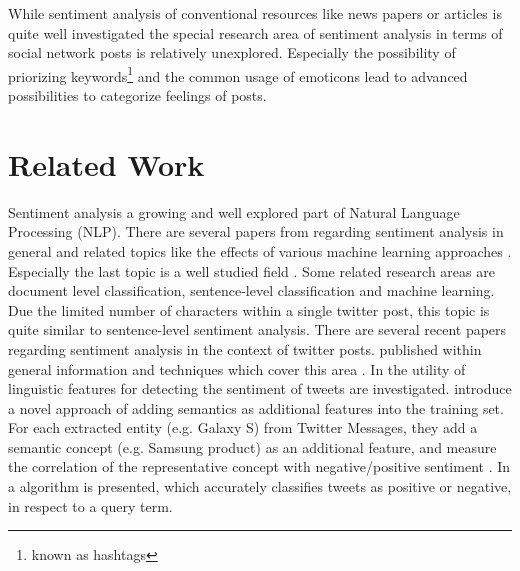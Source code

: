 While sentiment analysis of conventional resources like news papers or articles is quite well investigated the special research area of sentiment analysis in terms of social network posts is relatively unexplored. Especially the possibility of priorizing keywords\footnote{known as hashtags} and the common usage of emoticons lead to advanced possibilities to categorize feelings of posts.


\section{Related Work}
Sentiment analysis a growing and well explored part of Natural Language Processing (NLP). There are several papers from \citeauthor{Pang2008} regarding sentiment analysis in general and related topics like the effects of various machine learning approaches \autocite{Pang2002}\autocite{Pang2008}. Especially the last topic is a well studied field \autocite{Manning2000}.
Some related research areas are document level classification, sentence-level classification and machine learning. Due the limited number of characters within a single twitter post, this topic is quite similar to sentence-level sentiment analysis.
There are several recent papers regarding sentiment analysis in the context of twitter posts. \citeauthor{Agarwal2011} published within  general information and techniques which cover this area \autocite{Agarwal2011}. In  the utility of linguistic features for detecting the sentiment of tweets are investigated. 
\citeauthor{Saif2012} introduce a novel approach of adding semantics as additional features into the training set. For each extracted entity (e.g. Galaxy S) from Twitter Messages, they add a semantic concept (e.g. Samsung product) as an additional feature, and measure the correlation of the representative concept with negative/positive sentiment \autocite{Saif2012}. In  a algorithm is presented, which accurately classifies tweets as positive or negative, in respect to a query term\autocite{Go2009}.